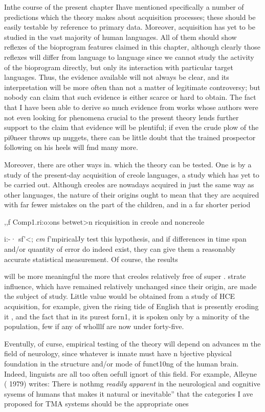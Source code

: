 Inthe course of the present chapter Ihave mentioned specifically a number of predictions which the theory makes about acquisition processes; these should be easily testable by reference to primary data. Moreover, acquisition has yet to be studied in the vast majority of human languages. All of them should show reflexes of the bioprogram features claimed in this chapter, although clearly those reflexes will differ from language to language since we cannot study the activity of the bioprogram directly, but only its interaction with particular target languages. Thus, the evidence available will not always be clear, and its interpretation will be more often than not a matter of legiti\-mate controversy; but nobody can claim that such evidence is either scarce or hard to obtain. The fact that I have been able to derive so much evidence from works whose authors were not even looking for phenomena crucial to the present theory lends further support to the claim that evidence will be plentiful; if even the crude plow of the pi0neer throws up nuggets, there can be little doubt that the trained prospector following on his heels will fmd many more.

Moreover, there are other ways in. which the theory can be tested. One is by a study of the present-day acquisition of creole languages, a study which has yet to be carried out. Although creoles are nowadays acquired in just the same way as other languages, the nature of their origins ought to mean that they are acquired with far fewer mistakes on the part of the children, and in a far shorter period

,,f Comp1.ri:o:ons betwet{\textgreater}n ricquisition in creole and noncreole

i:-· sf'{\textless}; \textit{cm} f'mpiricalJy test this hypothesis, and if differences in time span and/or quantity of error do indeed exist, they can give them a reasonably accurate statistical measurement. Of course, the results

will be more meaningful the more that creoles relatively free of super . strate influence, which have remained relatively unchanged since their origin, are made the subject of study. Little value would be obtained from a study of HCE acquisition, for example, given the rising tide of English that is presently eroding it , and the fact that in its purest forn1, it is spoken only by a minority of the population, few if any of wholllf are now under forty-five.


Eventully, of curse, empirical testing of the theory will depend on advances m the field of neurology, since whatever is innate must have n bjective physical foundation in the structure and/or mode of funct10ng of the human brain. Indeed, linguists are all too often oefull ignort of this field. For example, Alleyne ( 1979) writes: There is nothmg \textit{readily} \textit{apparent} in the neurological and cognitive sysems of humans that makes it natural or inevitable'' that the cate\-gories I ave proposed for TMA systems should be the appropriate ones

